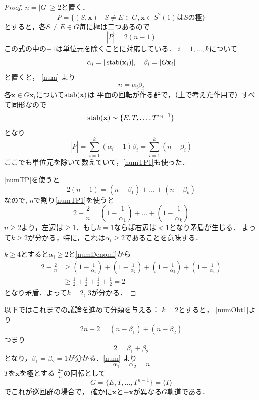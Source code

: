 \begin{proof}
$n=|G|\ge 2$と置く．
\[
     \tilde P 
     = 
     \{
          (S,\mathbf x)\mid S\neq E\in G, 
          \mathbf x\in S^2(1)\text{は} S \text{の極}
     \}
\]
とすると，各$S\neq E\in G$毎に極は二つあるので
\begin{equation}\label{numTP}
     |\tilde P| = 2(n-1)
\end{equation}
この式の中の$-1$は単位元を除くことに対応している．
$i=1,\dots,k$について
\[
     \alpha_i = |\operatorname{stab}(\mathbf x_i)|,\quad
     \beta_i = |G\mathbf x_i|
\]
と置くと，
\eqref{num} より
\begin{equation}\label{numTP1}
     n=\alpha_i \beta_i
\end{equation}
各$\mathbf x\in G\mathbf x_i$について$\operatorname{stab}(\mathbf x)$は
平面の回転が作る群で，（上で考えた作用で）すべて同形なので
\[
     \operatorname{stab}(\mathbf x)
     \sim
     \{
          E, T, \dots, T^{\alpha_i-1}
     \}
\]
となり
\begin{equation}\label{numObt}
     |\tilde P| 
     =
     \sum_{i=1}^k (\alpha_i-1)\beta_i
     =
     \sum_{i=1}^k (n - \beta_i)
\end{equation}
ここでも単位元を除いて数えていて，\eqref{numTP1}も使った．

 \eqref{numTP}を使うと
\begin{equation}\label{numObt1}
     2(n-1) = (n - \beta_1)+\dots+(n - \beta_k)
\end{equation}
なので, $n$で割り\eqref{numTP1}を使うと
\begin{equation}\label{numDenomi}
     2-\frac2n = (1-\frac1{\alpha_1})+\dots+ (1-\frac1{\alpha_k})
\end{equation}
$n\ge 2$より，左辺は$\ge 1$．もし$k=1$ならば右辺は$<1$となり矛盾が生じる．
よって$k\ge 2$が分かる，特に，これは$\alpha_i\ge 2$であることを意味する．

$k\ge 4$とすると$\alpha_i\ge 2$と\eqref{numDenomi}から
\[
\begin{split}
     2-\frac2n 
     &\ge 
          (1-\frac1{\alpha_1})+(1-\frac1{\alpha_2})
          +(1-\frac1{\alpha_3})+ (1-\frac1{\alpha_4})\\
     & \ge 
          \frac12+\frac12+\frac12+\frac12
     =2
\end{split}
\]
となり矛盾．よって$k=2$, $3$が分かる．
\end{proof}

以下ではこれまでの議論を進めて分類を与える：
$k=2$とすると， \eqref{numObt1}より
\[
     2n-2 = (n- \beta_1)+(n-\beta_2)
\]
つまり
\[
     2=\beta_1+\beta_2
\]
となり，$\beta_1=\beta_2=1$が分かる．\eqref{num} より
\[
     \alpha_1=\alpha_2=n
\]
$T$を$\mathbf x$を極とする
$\frac{2\pi}{n}$の回転として
\[
     G=
     \{
          E, T, \dots, T^{n-1}
     \}
     =\langle T\rangle
\]
でこれが巡回群の場合で，
確かに$\mathbf x$と$-\mathbf x$が異なる$G$軌道である．

